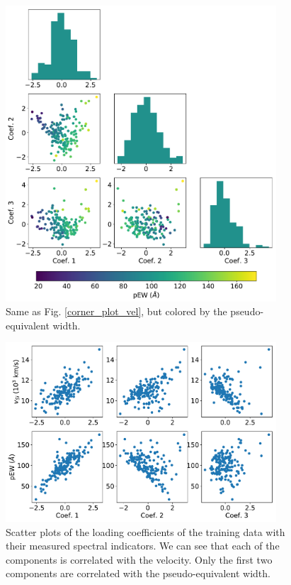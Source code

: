 \begin{figure}[!htb]
    \centering
    \includegraphics[width=0.9\textwidth]{figures/si_feat_pca/corner_plot_ew.pdf}
    \caption{Same as Fig. \ref{corner_plot_vel}, but colored by the pseudo-equivalent width.}
    \label{corner_plot_ew}
\end{figure}

\begin{figure}[!htb]
    \centering
    \includegraphics[width=0.9\textwidth]{figures/si_feat_pca/coef_vs_vel_and_ew.pdf}
    \caption{Scatter plots of the loading coefficients of the training data with their measured spectral indicators. We can see that each of the components is correlated with the velocity. Only the first two components are correlated with the pseudo-equivalent width.}
    \label{scatter_loading}
\end{figure}

